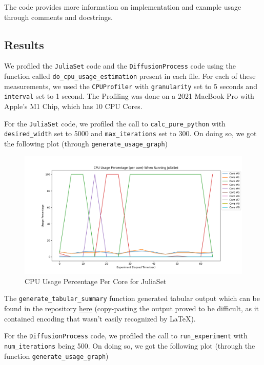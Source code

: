 \documentclass[a4paper,12pt]{article}
\begin{document}
The code provides more information on implementation and example usage through comments and docstrings.

\subsection{Results}
We profiled the \verb|JuliaSet| code and the \verb|DiffusionProcess| code using the function called \verb|do_cpu_usage_estimation| present in each file. For each of these measurements, we used the \verb|CPUProfiler| with \verb|granularity| set to 5 seconds and \verb|interval| set to 1 second. The Profiling was done on a 2021 MacBook Pro with Apple's M1 Chip, which has 10 CPU Cores. 

For the \verb|JuliaSet| code, we profiled the call to \verb|calc_pure_python| with \verb|desired_width| set to 5000 and \verb|max_iterations| set to 300. On doing so, we got the following plot (through \verb|generate_usage_graph|)

\begin{figure}[h!]
  \centering
  \includegraphics[width=\textwidth]{images/cpuprofile_juliaset.png}
  \caption{CPU Usage Percentage Per Core for JuliaSet}
  \label{fig:cpuprofiler_julia}
\end{figure}

The \verb|generate_tabular_summary| function generated tabular output which can be found in the repository \href{https://github.com/paulmyr/DD2358-HPC25/blob/master/01_profiling/outputs/cpuprofile_juliaset.output}{here} (copy-pasting the output proved to be difficult, as it contained encoding that wasn't easily recognized by \LaTeX). 

For the \verb|DiffusionProcess| code, we profiled the call to \verb|run_experiment| with \verb|num_iterations| being 500. On doing so, we got the following plot (through the function \verb|generate_usage_graph|)
\end{document}
